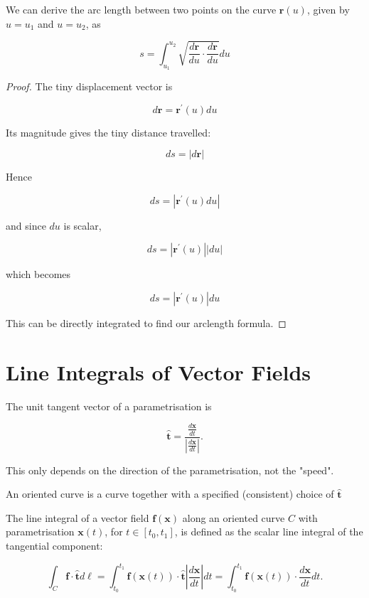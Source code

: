 \begin{nrem}[Arclength]
	We can derive the arc length between two points on the curve $\mathbf{r}(u)$, given by $u=u_1$ and $u=u_2$, as
	
	\begin{equation}
		s=\int_{u_1}^{u_2} \sqrt{\frac{d \mathbf{r}}{d u} \cdot \frac{d \mathbf{r}}{d u}} d u 
	\end{equation}
	
\end{nrem}

\begin{proof}
  The tiny displacement vector is
	
	$$
	d \mathbf{r}=\mathbf{r}^{\prime}(u) d u
	$$
	
	
	Its magnitude gives the tiny distance travelled:
	
	$$
	d s=|d \mathbf{r}|
	$$
	
	
	Hence
	
	$$
	d s=\left|\mathbf{r}^{\prime}(u) d u\right|
	$$
	
	and since $d u$ is scalar,
	
	$$
	d s=\left|\mathbf{r}^{\prime}(u)\right||d u|
	$$
	
	which becomes
	
	$$
	d s=\left|\mathbf{r}^{\prime}(u)\right| d u
	$$

  This can be directly integrated to find our arclength formula.
\end{proof}


\section{Line Integrals of Vector Fields}

\begin{definition}
  The unit tangent vector of a parametrisation is

$$
\hat{\boldsymbol{t}}=\frac{\frac{d \boldsymbol{x}}{d t}}{\left|\frac{d \boldsymbol{x}}{d t}\right|} .
$$

This only depends on the direction of the parametrisation, not the "speed".
\end{definition}

\begin{definition}
  An oriented curve is a curve together with a specified (consistent) choice of $\hat{\mathbf{t}}$
\end{definition}

\begin{definition}
  The line integral of a vector field $\boldsymbol{f}(\boldsymbol{x})$ along an oriented curve $C$ with parametrisation $\boldsymbol{x}(t)$, for $t \in\left[t_0, t_1\right]$, is defined as the scalar line integral of the tangential component:

$$
\int_C \boldsymbol{f} \cdot \hat{\boldsymbol{t}} d \ell=\int_{t_0}^{t_1} \boldsymbol{f}(\boldsymbol{x}(t)) \cdot \hat{\boldsymbol{t}}\left|\frac{d \boldsymbol{x}}{d t}\right| d t=\int_{t_0}^{t_1} \boldsymbol{f}(\boldsymbol{x}(t)) \cdot \frac{d \boldsymbol{x}}{d t} d t .
$$
\end{definition}

